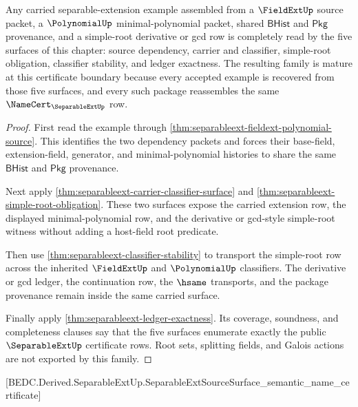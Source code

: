 \begin{theorem}
\label{thm:separableext-mature-example-family}
Any carried separable-extension example assembled from a $\FieldExtUp$ source
packet, a $\PolynomialUp$ minimal-polynomial packet, shared
$\mathsf{BHist}$ and $\mathsf{Pkg}$ provenance, and a simple-root derivative
or gcd row is completely read by the five surfaces of this chapter: source
dependency, carrier and classifier, simple-root obligation, classifier
stability, and ledger exactness. The resulting family is mature at this
certificate boundary because every accepted example is recovered from those
five surfaces, and every such package reassembles the same
$\NameCert_{\SeparableExtUp}$ row.
\end{theorem}
\begin{proof}
First read the example through
\autoref{thm:separableext-fieldext-polynomial-source}. This identifies the
two dependency packets and forces their base-field, extension-field,
generator, and minimal-polynomial histories to share the same $\mathsf{BHist}$
and $\mathsf{Pkg}$ provenance.

Next apply \autoref{thm:separableext-carrier-classifier-surface} and
\autoref{thm:separableext-simple-root-obligation}. These two surfaces expose
the carried extension row, the displayed minimal-polynomial row, and the
derivative or gcd-style simple-root witness without adding a host-field root
predicate.

Then use \autoref{thm:separableext-classifier-stability} to transport the
simple-root row across the inherited $\FieldExtUp$ and $\PolynomialUp$
classifiers. The derivative or gcd ledger, the continuation row, the $\hsame$
transports, and the package provenance remain inside the same carried
surface.

Finally apply \autoref{thm:separableext-ledger-exactness}. Its coverage,
soundness, and completeness clauses say that the five surfaces enumerate
exactly the public $\SeparableExtUp$ certificate rows. Root sets, splitting
fields, and Galois actions are not exported by this family.
\end{proof}

[BEDC.Derived.SeparableExtUp.SeparableExtSourceSurface\_semantic\_name\_certificate]


